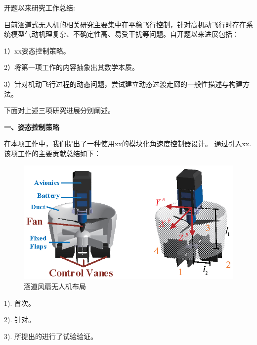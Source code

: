 \begin{ubox}
	\setlength{\parindent}{0em} 
开题以来研究工作总结:
\vspace{-0.25cm}


\setlength{\parindent}{2em} 

目前涵道式无人机的相关研究主要集中在平稳飞行控制，针对高机动飞行时存在系统模型气动机理复杂、不确定性高、易受干扰等问题。自开题以来进展包括：

1）xx姿态控制策略。

2）将第一项工作的内容抽象出其数学本质。



3）针对机动飞行过程的动态问题，尝试建立动态过渡走廊的一般性描述与构建方法。



下面对上述三项研究进展分别阐述。

\textbf{\fangsong\xiaosihao 一、姿态控制策略}
\setlength{\parindent}{2em} 

在本项工作中，我们提出了一种使用xx的模块化角速度控制器设计。 通过引入xx. 该项工作的主要贡献总结如下：
\begin{figure}[H]
	\centering
	\includegraphics{Fig/Fig2.eps}
	\caption{涵道风扇无人机布局}
	\label{fig:2}     
\end{figure}
1). 首次。

2). 针对。

3). 所提出的进行了试验验证。


\end{ubox}
